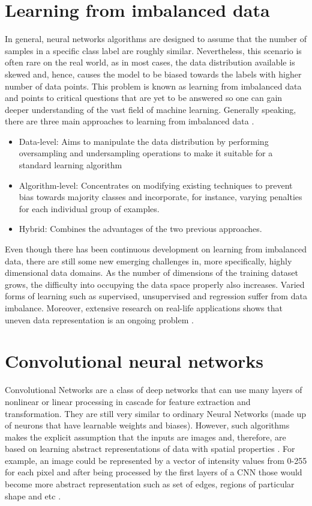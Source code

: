\section{Learning from imbalanced data}
In general, neural networks algorithms are designed to assume that the number of samples in a specific class label are roughly similar. Nevertheless, this scenario is often rare on the real world, as in most cases, the data distribution available is skewed and, hence, causes the model to be biased towards the labels with higher number of data points. This problem is known as learning from imbalanced data \cite{japkowicz2002class} and points to critical questions that are yet to be answered so one can gain deeper understanding of the vast field of machine learning. Generally speaking, there are three main approaches to learning from imbalanced data \cite{krawczyk2016learning}. 
\begin{itemize}
	\item Data-level: Aims to manipulate the data distribution by performing oversampling and undersampling operations to make it suitable for a standard learning algorithm
	\item Algorithm-level: Concentrates on modifying existing techniques to prevent bias towards majority classes and incorporate, for instance, varying penalties for each individual group of examples.
	\item Hybrid: Combines the advantages of the two previous approaches.
\end{itemize}

Even though there has been continuous development on learning from imbalanced data, there are still some new emerging challenges in, more specifically, highly dimensional data domains. As the number of dimensions of the training dataset grows, the difficulty into occupying the data space properly also increases. Varied forms of learning such as supervised, unsupervised and regression suffer from data imbalance. Moreover, extensive research on real-life applications shows that uneven data representation is an ongoing problem \cite{krawczyk2016learning}.
\section{Convolutional neural networks}

Convolutional Networks are a class of deep networks that can use many layers of nonlinear or linear processing in cascade for feature extraction and transformation. They are still very similar to ordinary Neural Networks (made up of neurons that have learnable weights and biases). However, such algorithms makes the explicit assumption that the inputs are images and, therefore, are based on learning abstract representations of data with spatial properties \cite{goodfellow2016_book}. For example, an image could be represented by a vector of intensity values from 0-255 for each pixel and after being processed by the first layers of a CNN those would become more abstract representation such as set of edges, regions of particular shape and etc \cite{stanford2016}.

